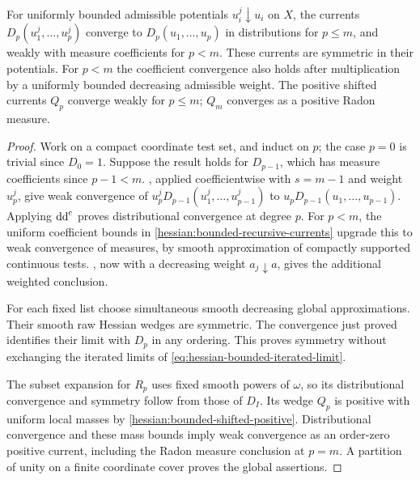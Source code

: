 \begin{theorem}\label{hessian:joint-decreasing-products}\label{hessian:bounded-two-factor-convergence}\label{hessian:bounded-linear-weighted-convergence}
For uniformly bounded admissible potentials $u_i^j\downarrow u_i$
on $X$, the currents $D_p(u_1^j,\ldots,u_p^j)$ converge to
$D_p(u_1,\ldots,u_p)$ in distributions for $p\leq m$, and weakly
with measure coefficients for $p<m$. These currents are symmetric
in their potentials. For $p<m$ the coefficient convergence also
holds after multiplication by a uniformly bounded decreasing
admissible weight. The positive shifted currents $Q_p$ converge
weakly for $p\leq m$; $Q_m$ converges as a positive Radon measure.
\end{theorem}
\begin{proof}
Work on a compact coordinate test set, and induct on $p$; the case
$p=0$ is trivial since $D_0=1$. Suppose the result holds for
$D_{p-1}$, which has measure coefficients since $p-1<m$.
,
applied coefficientwise with $s=m-1$ and weight $u_p^j$, give weak
convergence of $u_p^jD_{p-1}(u_1^j,\ldots,u_{p-1}^j)$ to
$u_pD_{p-1}(u_1,\ldots,u_{p-1})$. Applying $\mathrm{dd}^{\mathrm{c}}$ proves
distributional convergence at degree $p$. For $p<m$, the uniform
coefficient bounds in \cref{hessian:bounded-recursive-currents}
upgrade this to weak convergence of measures, by smooth
approximation of compactly supported continuous tests.
, now with a decreasing
weight $a_j\downarrow a$, gives the additional weighted conclusion.

For each fixed list choose simultaneous smooth decreasing global
approximations. Their smooth raw Hessian wedges are symmetric.
The convergence just proved identifies their limit with $D_p$
in any ordering. This proves symmetry without exchanging the
iterated limits of \eqref{eq:hessian-bounded-iterated-limit}.

The subset expansion for $R_p$ uses fixed smooth powers of
$\omega$, so its distributional convergence and symmetry follow
from those of $D_I$. Its wedge $Q_p$ is positive with uniform
local masses by \cref{hessian:bounded-shifted-positive}.
Distributional convergence and these mass bounds imply weak
convergence as an order-zero positive current, including the
Radon measure conclusion at $p=m$. A partition of unity on a
finite coordinate cover proves the global assertions.
\end{proof}


